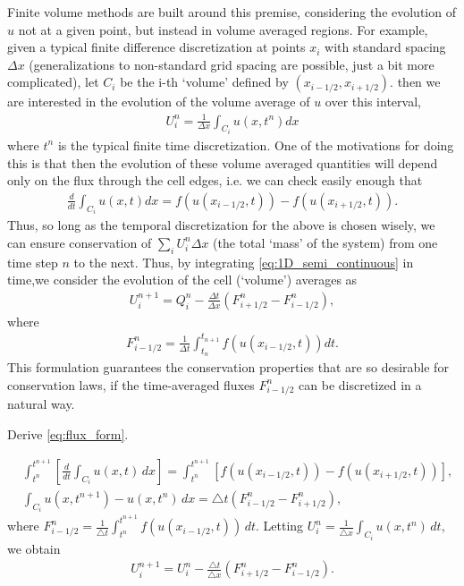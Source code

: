 Finite volume methods are built around this premise, considering the evolution of $u$ not at a given point, but instead in volume averaged regions.  For example, given a typical finite difference discretization at points $x_i$ with standard spacing $\Delta x$ (generalizations to non-standard grid spacing are possible, just a bit more complicated), let $C_i$ be the i-th `volume' defined by $(x_{i-1/2},x_{i+1/2})$. then we are interested in the evolution of the volume average of $u$ over this interval,
\begin{gather}
U_i^n  = \frac{1}{\Delta x}\int_{C_i} u(x,t^n)dx
\end{gather}
where $t^n$ is the typical finite time discretization.  One of the motivations for doing this is that then the evolution of these volume averaged quantities will depend only on the flux through the cell edges, i.e. we can check easily enough that
\begin{gather}\label{eq:1D_semi_continuous}
\frac{d}{dt}\int_{C_i} u(x,t) dx = f(u(x_{i-1/2},t))-f(u(x_{i+1/2},t)).
\end{gather}
Thus, so long as the temporal discretization for the above is chosen wisely, we can ensure conservation of $\sum_i U_i^n\Delta x$ (the total `mass' of the system) from one time step $n$ to the next.  Thus, by integrating \eqref{eq:1D_semi_continuous} in time,we consider the evolution of the cell (`volume') averages as
\begin{gather}\label{eq:flux_form}
U_i^{n+1} = Q_i^n - \frac{\Delta t}{\Delta x} \left(F^n_{i+1/2}-F^n_{i-1/2}\right),
\end{gather}
where
\begin{gather}
F_{i-1/2}^n = \frac{1}{\Delta t} \int_{t_n}^{t_{n+1}}f(u(x_{i-1/2},t))dt. 
\end{gather}
This formulation guarantees the conservation properties that are so desirable for conservation laws, if the time-averaged fluxes $F_{i-1/2}^n$ can be discretized in a natural way.

\begin{problem}
Derive \eqref{eq:flux_form}.

\begin{align*}
&{ }\int_{t^n}^{t^{n+1}} \left[ \frac{d}{dt}\int_{C_i} u(x,t)\, dx \right] = \int_{t^n}^{t^{n+1}} \left[ f(u(x_{i-1/2},t)) - f(u(x_{i+1/2},t)) \right], \\
&{ }\int_{C_i} u(x,t^{n+1}) - u(x,t^{n})\, dx = \triangle t \left(F^n_{i-1/2} - F^n_{i+1/2}\right),
\end{align*}
where $F^n_{i-1/2} = \frac{1}{\triangle t}\int_{t^n}^{t^{n+1}} f(u(x_{i-1/2},t)) \, dt.$
Letting $U_i^n = \frac{1}{\triangle x} \int_{C_i} u(x,t^n) \, dt$, we obtain 
\begin{align*}
	U_i^{n+1} = U_i^n - \frac{\triangle t}{\triangle x} \left( F^n_{i+1/2} - F^n_{i-1/2}\right).
\end{align*}
\end{problem}

